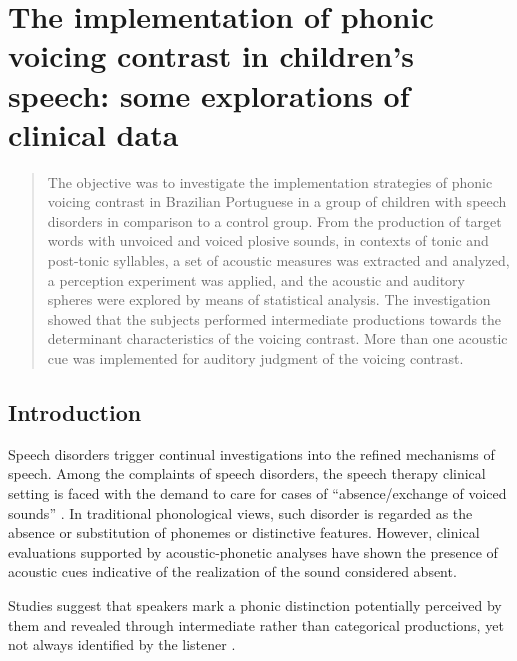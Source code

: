 \chapter{The implementation of phonic voicing contrast in children’s speech: some explorations of clinical data}\label{ch:zuleicacamarg13}
\begin{affils}
\end{affils}


\begin{abstract}
The objective was to investigate the implementation strategies of phonic
voicing contrast in Brazilian Portuguese in a group of children with speech
disorders in comparison to a control group. From the production of target words
with unvoiced and voiced plosive sounds, in contexts of tonic and post-tonic
syllables, a set of acoustic measures was extracted and analyzed, a perception
experiment was applied, and the acoustic and auditory spheres were explored by
means of statistical analysis. The investigation showed that the subjects
performed intermediate productions towards the determinant characteristics of
the voicing contrast. More than one acoustic cue was implemented for auditory
judgment of the voicing contrast.
\end{abstract}


\section{Introduction}
Speech disorders trigger continual investigations into the refined mechanisms
of speech. Among the complaints of speech disorders, the speech therapy
clinical setting is faced with the demand to care for cases of
“absence/exchange of voiced sounds” \citep{keskesoares2004,mota2012}.
In traditional phonological views, such disorder is regarded as the
absence or substitution of phonemes or distinctive features. However, clinical
evaluations supported by acoustic-phonetic analyses have shown the presence of
acoustic cues indicative of the realization of the sound considered absent.

Studies suggest that speakers mark a phonic distinction potentially perceived
by them and revealed through intermediate rather than categorical productions,
yet not always identified by the listener \citep{levy1993,ficker2003,gregio2005,rodrigues2008,gregio2011,pereira2012}.

